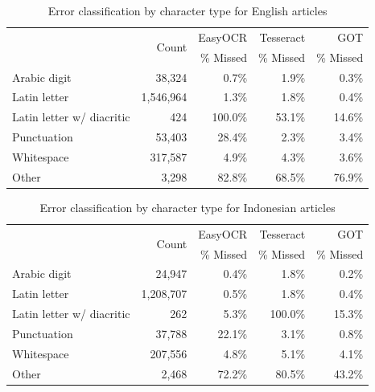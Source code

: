 \documentclass[12pt,oneside]{memoir}
\begin{document}
\begin{table}[ht]
    \caption{Error classification by character type for English articles}
    \label{table:english-error-classification}
    \centering
    \begin{tabular}{lrrrr}
        \toprule
        & \multirow{2}{*}{Count} & EasyOCR & Tesseract & GOT\\
        & & \% Missed & \% Missed & \% Missed\\
        \midrule
        Arabic digit & 38,324 & 0.7\% & 1.9\% & 0.3\%\\
        Latin letter & 1,546,964 & 1.3\% & 1.8\% & 0.4\%\\
        Latin letter w/ diacritic & 424 & 100.0\% & 53.1\% & 14.6\%\\
        Punctuation & 53,403 & 28.4\% & 2.3\% & 3.4\%\\
        Whitespace & 317,587 & 4.9\% & 4.3\% & 3.6\%\\
        Other & 3,298 & 82.8\% & 68.5\% & 76.9\%\\
        \bottomrule
    \end{tabular}
\end{table}

\begin{table}[ht]
    \caption{Error classification by character type for Indonesian articles}
    \label{table:indonesian-error-classification}
    \centering
    \begin{tabular}{lrrrr}
        \toprule
        & \multirow{2}{*}{Count} & EasyOCR & Tesseract & GOT\\
        & & \% Missed & \% Missed & \% Missed\\
        \midrule
        Arabic digit & 24,947 & 0.4\% & 1.8\% & 0.2\%\\
        Latin letter & 1,208,707 & 0.5\% & 1.8\% & 0.4\%\\
        Latin letter w/ diacritic & 262 & 5.3\% & 100.0\% & 15.3\%\\
        Punctuation & 37,788 & 22.1\% & 3.1\% & 0.8\%\\
        Whitespace & 207,556 & 4.8\% & 5.1\% & 4.1\%\\
        Other & 2,468 & 72.2\% & 80.5\% & 43.2\%\\
        \bottomrule
    \end{tabular}
\end{table}
\end{document}
